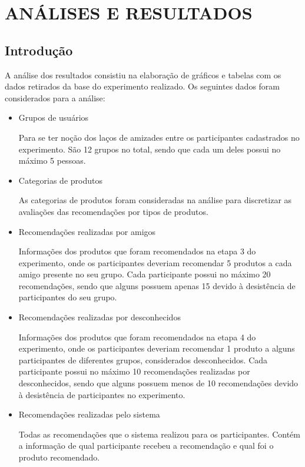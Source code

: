 \chapter{ANÁLISES E RESULTADOS} %
\label{cha:analises_e_resultados}

\section{Introdução}
\label{cha:introducao}

 A análise dos resultados consistiu na elaboração de gráficos e tabelas com os dados retirados da base do experimento realizado. Os seguintes dados foram considerados para a análise:
 
\begin{itemize}
	\item Grupos de usuários
	
	Para se ter noção dos laços de amizades entre os participantes cadastrados no experimento. São 12 grupos no total, sendo que cada um deles possui no máximo 5 pessoas.
	
	\item Categorias de produtos
	
	As categorias de produtos foram consideradas na análise para discretizar as avaliações das recomendações por tipos de produtos.
	
	\item Recomendações realizadas por amigos
	
	Informações dos produtos que foram recomendados na etapa 3 do experimento, onde os participantes deveriam recomendar 5 produtos a cada amigo presente no seu grupo. Cada participante possui no máximo 20 recomendações, sendo que alguns possuem apenas 15 devido à desistência de participantes do seu grupo.
	
	\item Recomendações realizadas por desconhecidos
	
	Informações dos produtos que foram recomendados na etapa 4 do experimento, onde os participantes deveriam recomendar 1 produto a alguns participantes de diferentes grupos, considerados desconhecidos. Cada participante possui no máximo 10 recomendações realizadas por desconhecidos, sendo que alguns possuem menos de 10 recomendações devido à desistência de participantes no experimento.
	
	\item Recomendações realizadas pelo sistema
	
	Todas as recomendações que o sistema realizou para os participantes. Contém a informação de qual participante recebeu a recomendação e qual foi o produto recomendado.
	

\end{itemize}
